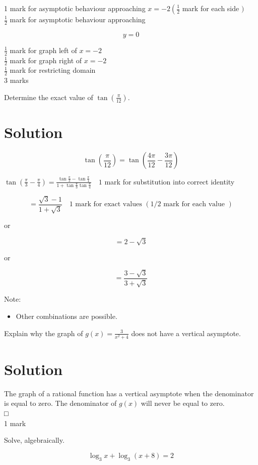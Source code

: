 \documentclass[10pt]{article}
\begin{document}
1 mark for asymptotic behaviour approaching $x=-2\left(\frac{1}{2}\right.$ mark for each side $)$\\
$\frac{1}{2}$ mark for asymptotic behaviour approaching

$$
y=0
$$

$\frac{1}{2}$ mark for graph left of $x=-2$\\
$\frac{1}{2}$ mark for graph right of $x=-2$\\
$\frac{1}{2}$ mark for restricting domain\\
3 marks

Determine the exact value of $\tan \left(\frac{\pi}{12}\right)$.

\section*{Solution}
$$
\tan \left(\frac{\pi}{12}\right)=\tan \left(\frac{4 \pi}{12}-\frac{3 \pi}{12}\right)
$$

$\tan \left(\frac{\pi}{3}-\frac{\pi}{4}\right)=\frac{\tan \frac{\pi}{3}-\tan \frac{\pi}{4}}{1+\tan \frac{\pi}{3} \tan \frac{\pi}{4}} \quad 1$ mark for substitution into correct identity

$$
=\frac{\sqrt{3}-1}{1+\sqrt{3}} \quad 1 \text { mark for exact values }(1 / 2 \text { mark for each value })
$$

or

$$
=2-\sqrt{3}
$$

or

$$
=\frac{3-\sqrt{3}}{3+\sqrt{3}}
$$

Note:

\begin{itemize}
  \item Other combinations are possible.
\end{itemize}

Explain why the graph of $g(x)=\frac{3}{x^{2}+4}$ does not have a vertical asymptote.

\section*{Solution}
The graph of a rational function has a vertical asymptote when the denominator is equal to zero. The denominator of $g(x)$ will never be equal to zero.\\
□\\
1 mark

Solve, algebraically.

$$
\log _{3} x+\log _{3}(x+8)=2
$$
\end{document}
